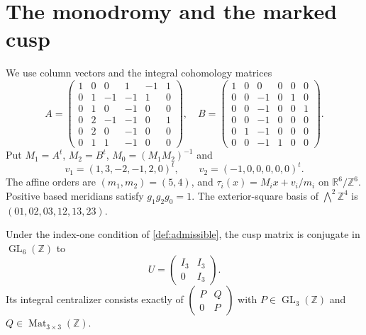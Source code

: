 \section{The monodromy and the marked cusp}\label{pub:V:sec-local}

\begin{definition}\hypertarget{tag-PV02}{}\label{pub:V:rank-six-data}\hypertarget{tag-034O}{}\label{sec:fourfold}
We use column vectors and the integral cohomology matrices
\[
A=\begin{pmatrix}
1&0&0&1&-1&1\\0&1&-1&-1&1&0\\0&1&0&-1&0&0\\
0&2&-1&-1&0&1\\0&2&0&-1&0&0\\0&1&1&-1&0&0
\end{pmatrix},\quad
B=\begin{pmatrix}
1&0&0&0&0&0\\0&0&-1&0&1&0\\0&0&-1&0&0&1\\
0&0&-1&0&0&0\\0&1&-1&0&0&0\\0&0&-1&1&0&0
\end{pmatrix}.
\]
Put $M_1=A^t$, $M_2=B^t$, $M_0=(M_1M_2)^{-1}$ and
\[
 v_1=(1,3,-2,-1,2,0)^t,\qquad v_2=(-1,0,0,0,0,0)^t.
\]
The affine orders are $(m_1,m_2)=(5,4)$, and $\tau_i(x)=M_ix+v_i/m_i$ on $\mathbb R^6/\mathbb Z^6$.
Positive based meridians satisfy $g_1g_2g_0=1$. The exterior-square basis of $\bigwedge^2\mathbb Z^4$ is $(01,02,03,12,13,23)$.
\end{definition}

\begin{proposition}\hypertarget{tag-02MY}{}\hypertarget{tag-02R7}{}\label{maps:src:F.2.1}


Under the index-one condition of \cref{def:admissible}, the cusp matrix is
conjugate in $\operatorname{GL}_6(\mathbb Z)$ to
\[
 U=\begin{pmatrix}I_3&I_3\\0&I_3\end{pmatrix}.
\]
Its integral centralizer consists exactly of
$\left(\begin{smallmatrix}P&Q\\0&P\end{smallmatrix}\right)$
with $P\in\operatorname{GL}_3(\mathbb Z)$ and
$Q\in\operatorname{Mat}_{3\times3}(\mathbb Z)$.

\end{proposition}


